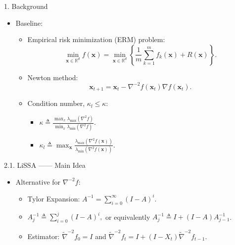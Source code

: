 \documentclass[pdf]{beamer}
\theoremstyle{remark}
\theoremstyle{definition}
\begin{document}
\begin{frame}{1. Background}
\begin{itemize}
	\item Baseline: 
	\begin{itemize}
		\item Empirical risk minimization (ERM) problem:
		$$\min _{\mathbf{x} \in \mathbb{R}^{d}} f(\mathbf{x})=\min _{\mathbf{x} \in \mathbb{R}^{d}}\left\{\frac{1}{m} \sum_{k=1}^{m} f_{k}(\mathbf{x})+R(\mathbf{x})\right\}.$$
		\item Newton method:
		$$\mathbf{x}_{t+1}=\mathbf{x}_{t}-\nabla^{-2} f\left(\mathbf{x}_{t}\right) \nabla f\left(\mathbf{x}_{t}\right).$$
		\item Condition number, $\kappa_{l} \leq \kappa$: 
		\begin{itemize}
			\item $\kappa \triangleq \frac{\max _{x} \lambda_{\max }\left(\nabla^{2} f\right)}{\min _{x} \lambda_{\min }\left(\nabla^{2} f\right)}.$
			\item $\kappa_{l} \triangleq \max _{\mathbf{x}} \frac{\lambda_{\max }\left(\nabla^{2} f(\mathbf{x})\right)}{\lambda_{\min }\left(\nabla^{2} f(\mathbf{x})\right)}.$

		\end{itemize}
	\end{itemize}
\end{itemize}
\end{frame}



\begin{frame}{2.1. LiSSA —— Main Idea}
\begin{itemize}
		\item Alternative for $\nabla^{-2} f$:
		\begin{itemize}
			\item Tylor Expansion: $A^{-1}=\sum\limits_{i=0}^{\infty}(I-A)^{i}$.
			\item $A_{j}^{-1} \triangleq \sum_{i=0}^{j}(I-A)^{i},$ or equivalently $A_{j}^{-1} \triangleq I+(I-A) A_{j-1}^{-1}$.
			\item Estimator: $\tilde{\nabla}^{-2} f_{0}=I$ and $\tilde{\nabla}^{-2} f_{t}=I+\left(I-X_{t}\right) \tilde{\nabla}^{-2} f_{t-1}$.
		\end{itemize}
\end{itemize}
\end{frame}
\end{document}
